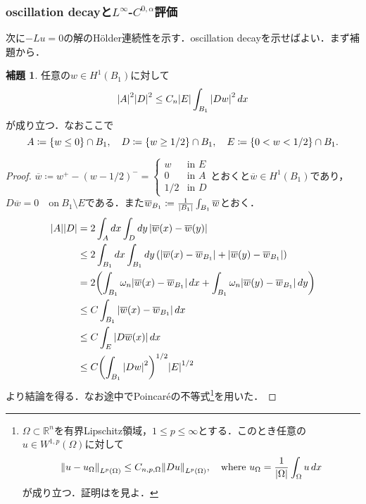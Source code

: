 \documentclass[a4paper]{ltjsarticle}
\newcommand{\Rset}{\mathbb{R}}
\newcommand{\Om}{\Omega}
\newcommand{\on}{\quad \text{on}\ }
\newcommand{\1}{\mathbbm{1}}
\numberwithin{equation}{section}
\theoremstyle{definition}
\newtheorem{lem}[thm]{補題}
\begin{document}
\subsubsection{\texorpdfstring{oscillation decayと$L^\infty$-$C^{0,\alpha}$評価}{TEXT}}
次に$-Lu=0$の解のHölder連続性を示す．oscillation decayを示せばよい．まず補題から．
\begin{lem}\label{lem:isoperimetric_ineq_of_degiorgi}
    任意の$w\in H^1(B_1)$に対して
    \begin{equation}
        \abs{A}^2\abs{D}^2\leq C_n \abs{E}\int_{B_1}\abs{Dw}^2\,dx 
    \end{equation}
    が成り立つ．なおここで
    \begin{equation}
        A\coloneqq \qty{w\leq 0}\cap B_1,\quad D\coloneqq \qty{w\geq 1/2}\cap B_1,\quad E\coloneqq \qty{0<w<1/2}\cap B_1.
    \end{equation}
\end{lem}
\begin{proof}
    $\overline{w}\coloneqq w^+-(w-1/2)^-=\begin{cases}
        w & \text{in $E$}\\
        0 & \text{in $A$}\\
        1/2 & \text{in $D$}
    \end{cases}$とおくと$\overline{w}\in H^1(B_1)$であり，$D\overline{w}=0\on B_1\setminus E$である．また$\overline{w}_{B_1}\coloneqq \frac{1}{\abs{B_1}}\int_{B_1}\overline{w}$とおく．
    \begin{align}
        \abs{A}\abs{D}&=2\int_{A}dx\int_{D}dy\,\abs{\overline{w}(x)-\overline{w}(y)}\\
        &\leq 2\int_{B_1}dx\int_{B_1}dy\, \qty(\abs{\overline{w}(x)-\overline{w}_{B_1}}+\abs{\overline{w}(y)-\overline{w}_{B_1}})\\
        &=2\qty(\int_{B_1}\omega_n\abs{\overline{w}(x)-\overline{w}_{B_1}}\,dx+\int_{B_1}\omega_n\abs{\overline{w}(y)-\overline{w}_{B_1}}\,dy)\\
        &\leq C\int_{B_1}\abs{\overline{w}(x)-\overline{w}_{B_1}}\,dx\\
        &\leq C\int_{E}\abs{D\overline{w}(x)}\,dx\\
        &\leq C\qty(\int_{B_1}\abs{Dw}^2)^{1/2}\abs{E}^{1/2}\\
    \end{align}
    より結論を得る．なお途中でPoincaréの不等式\footnote{$\Om\subset \Rset^n$を有界Lipschitz領域，$1\leq p\leq \infty$とする．このとき任意の$u\in W^{1,p}(\Om)$に対して
    \begin{equation}
        \norm{u-u_{\Om}}_{L^p(\Om)}\leq C_{n,p,\Om}\norm{Du}_{L^p(\Om)},\quad \text{where }u_{\Om}=\frac{1}{\abs{\Om}}\int_{\Om}u\,dx 
    \end{equation}
    が成り立つ．証明は\cite[Section 5.8.1]{eva}を見よ．}を用いた．
\end{proof}
\end{document}
